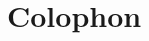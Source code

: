 \chapter{Colophon}
\small\OnehalfSpacing%

\begin{comment}
Two versions of this dissertation are available. The contents of both are identical; only the formatting differs.
\begin{enumerate}[nosep]
  \item \url{https://leonora.org}\\\noindent%
  This version, the readable version, has been formatted according to standard typographic practice with an emphasis on readability, and it is hoped, good taste and elegance. 
  \item \url{https://sjsu.edu}\\\noindent%
  This version, the official, submitted version, has been formatted to meet the SJSU Ed.D. doctoral dissertation guidelines. You should read this version only under duress.
\end{enumerate}
\end{comment}


